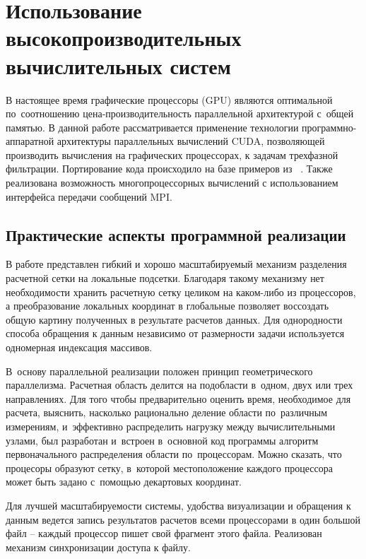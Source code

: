 \chapter{Использование высокопроизводительных вычислительных систем} \label{ch:ch4}

В настоящее время графические процессоры (GPU)
являются оптимальной по~соотношению цена-производительность параллельной 
архитектурой с~общей памятью.
В данной работе рассматривается применение технологии программно-аппаратной архитектуры параллельных вычислений CUDA, позволяющей производить вычисления на графических процессорах, к задачам трехфазной фильтрации.
Портирование кода происходило на базе примеров из ~\cite{Sanders-CUDA}.
Также реализована возможность многопроцессорных вычислений с использованием
интерфейса передачи сообщений MPI.

\section{Практические аспекты программной реализации} \label{ch:ch4/sect1}

В работе представлен гибкий и хорошо масштабируемый механизм разделения
расчетной сетки на локальные подсетки. Благодаря такому механизму
нет необходимости хранить расчетную сетку целиком на каком-либо из
процессоров, а преобразование локальных координат в глобальные
позволяет воссоздать общую картину полученных в результате расчетов
данных. Для однородности способа обращения к данным независимо
от размерности задачи используется одномерная индексация массивов.

В~основу параллельной реализации положен принцип геометрического параллелизма.
Расчетная область делится на подобласти в~одном, двух или трех направлениях.
Для того чтобы предварительно оценить время, необходимое для расчета, выяснить, насколько 
рационально деление области по~различным измерениям, и~эффективно распределить нагрузку
между вычислительными узлами, был разработан и~встроен в~основной код программы
алгоритм первоначального распределения области по~процессорам.
Можно сказать, что процесоры образуют сетку, в~которой местоположение каждого процессора может быть задано с~помощью декартовых координат.

Для лучшей масштабируемости системы, удобства визуализации и обращения
к данным ведется запись результатов расчетов всеми процессорами в один большой файл -- каждый процессор
пишет свой фрагмент этого файла. Реализован механизм синхронизации доступа к файлу.

